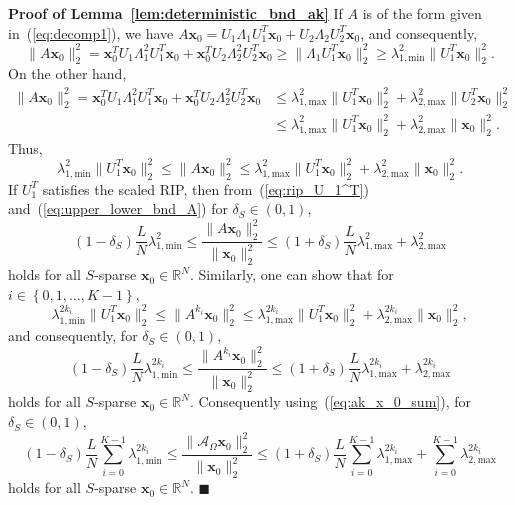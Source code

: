 \documentclass[11pt,draftcls,onecolumn]{IEEEtran}
\def\real    { \mathbb{R} }
\def \ak {{\mathcal{A}_{\Omega}}}
\newcommand{\vc}[1]{\boldsymbol{#1}}
\def\real    { \mathbb{R} }
\begin{document}
{\textbf{Proof of Lemma~\ref{lem:deterministic_bnd_ak}}}
If $A$ is of the form given in~(\ref{eq:decomp1}), we have
$A\vc{x}_0 = U_1\Lambda_1U_1^T\vc{x}_0 + U_2\Lambda_2U_2^T\vc{x}_0$, and consequently,
\[
\|A\vc{x}_0\|_2^2 = \vc{x}_0^TU_1\Lambda_1^2U_1^T\vc{x}_0+\vc{x}_0^TU_2\Lambda_2^2U_2^T\vc{x}_0 \geq \|\Lambda_1U_1^T\vc{x}_0\|_2^2 \geq \lambda_{1,\text{min}}^2\|U_1^T\vc{x}_0\|_2^2.
\]
On the other hand,
\begin{align*}
\|A\vc{x}_0\|_2^2 = \vc{x}_0^TU_1\Lambda_1^2U_1^T\vc{x}_0+\vc{x}_0^TU_2\Lambda_2^2U_2^T\vc{x}_0 &\leq \lambda_{1,\text{max}}^2\|U_1^T\vc{x}_0\|_2^2 + \lambda_{2,\text{max}}^2\|U_2^T\vc{x}_0\|_2^2 \\
&\leq \lambda_{1,\text{max}}^2\|U_1^T\vc{x}_0\|_2^2 + \lambda_{2,\text{max}}^2\|\vc{x}_0\|_2^2.
\end{align*}
Thus,
\begin{equation}
\lambda_{1,\text{min}}^{2}\|U_1^T\vc{x}_0\|_2^2 \leq \|A\vc{x}_0\|_2^2 \leq \lambda_{1,\text{max}}^{2}\|U_1^T\vc{x}_0\|_2^2 + \lambda_{2,\text{max}}^{2}\|\vc{x}_0\|_2^2.
\label{eq:upper_lower_bnd_A}
\end{equation}
If $U_1^T$ satisfies the scaled \ac{RIP}, then from~(\ref{eq:rip_U_1^T}) and~(\ref{eq:upper_lower_bnd_A})
for $\delta_S \in (0,1)$,
\begin{equation}
(1-\delta_S)\frac{L}{N}\lambda_{1,\text{min}}^{2} \leq \frac{\|A\vc{x}_0\|_2^2}{\|\vc{x}_0\|_2^2} \leq (1+\delta_S)\frac{L}{N}\lambda_{1,\text{max}}^{2} +  \lambda_{2,\text{max}}^{2}
\end{equation}
holds for all $S$-sparse $\vc{x}_0 \in \real^N$. 
Similarly, one can show that for $i \in \left\{0, 1, \dots, K-1\right\}$,
\[
\lambda_{1,\text{min}}^{2k_i}\|U_1^T\vc{x}_0\|_2^2 \leq \|A^{k_i}\vc{x}_0\|_2^2 \leq \lambda_{1,\text{max}}^{2k_i}\|U_1^T\vc{x}_0\|_2^2 + \lambda_{2,\text{max}}^{2k_i}\|\vc{x}_0\|_2^2,
\]
and consequently, for $\delta_S \in (0,1)$,
\begin{equation}
(1-\delta_S)\frac{L}{N}\lambda_{1,\text{min}}^{2k_i} \leq \frac{\|A^{k_i}\vc{x}_0\|_2^2}{\|\vc{x}_0\|_2^2} \leq (1+\delta_S)\frac{L}{N}\lambda_{1,\text{max}}^{2k_i} +  \lambda_{2,\text{max}}^{2k_i}
\label{eq:deterministic_bnd_A_k_i}
\end{equation}
holds for all $S$-sparse $\vc{x}_0 \in \real^N$. Consequently using~(\ref{eq:ak_x_0_sum}), for $\delta_S \in (0,1)$,
\begin{equation*}
(1-\delta_S)\frac{L}{N}\sum_{i=0}^{K-1}\lambda_{1,\text{min}}^{2k_i} \leq \frac{\|\ak\vc{x}_0\|_2^2}{\|\vc{x}_0\|_2^2} \leq (1+\delta_S)\frac{L}{N}\sum_{i=0}^{K-1}\lambda_{1,\text{max}}^{2k_i} +  \sum_{i=0}^{K-1}\lambda_{2,\text{max}}^{2k_i}
\end{equation*}
holds for all $S$-sparse $\vc{x}_0 \in \real^N$. 
\hfill $\blacksquare$
\end{document}
